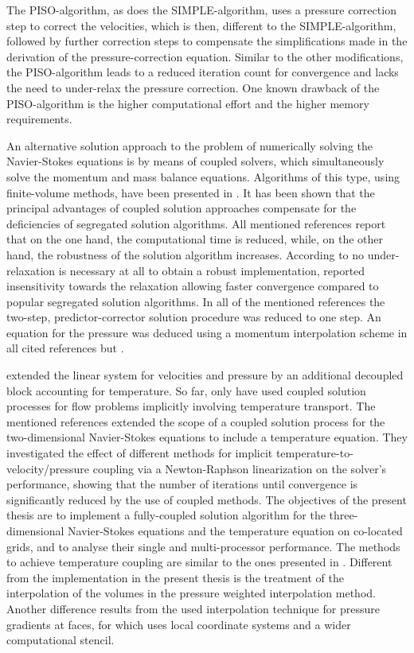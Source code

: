 The PISO-algorithm, as does the SIMPLE-algorithm, uses a pressure correction step to correct the velocities, which is then, different to the SIMPLE-algorithm, followed by further correction steps to compensate the simplifications made in the derivation of the pressure-correction equation. Similar to the other modifications, the PISO-algorithm leads to a reduced iteration count for convergence and lacks the need to under-relax the pressure correction. One known drawback of the PISO-algorithm is the higher computational effort and the higher memory requirements.

An alternative solution approach to the problem of numerically solving the Navier-Stokes equations is by means of coupled solvers, which simultaneously solve the momentum and mass balance equations. Algorithms of this type, using finite-volume methods, have been presented in \cite{chen10,darwish09,falk13,galpin86,klaij13,mangani14,vakilipour12}. It has been shown \cite{darwish09} that the principal advantages of coupled solution approaches compensate for the deficiencies of segregated solution algorithms. All mentioned references report that on the one hand, the computational time is reduced, while, on the other hand, the robustness of the solution algorithm increases. According to \cite{darwish09} no under-relaxation is necessary at all to obtain a robust implementation, \cite{galpin86} reported insensitivity towards the relaxation allowing faster convergence compared to popular segregated solution algorithms. In all of the mentioned references the two-step, predictor-corrector solution procedure was reduced to one step. An equation for the pressure was deduced using a momentum interpolation scheme \cite{rhie82} in all cited references but \cite{galpin86}.

\cite{chen10} extended the linear system for velocities and pressure by an additional decoupled block accounting for temperature. So far, only \cite{galpin86,vakilipour12} have used coupled solution processes for flow problems implicitly involving temperature transport.  The mentioned references extended the scope of a coupled solution process for the two-dimensional Navier-Stokes equations to include a temperature equation. They investigated the effect of different methods for implicit temperature-to-velocity/pressure coupling via a Newton-Raphson linearization on the solver's performance, showing that the number of iterations until convergence is significantly reduced by the use of coupled methods. The objectives of the present thesis are to implement a fully-coupled solution algorithm for the three-dimensional Navier-Stokes equations and the temperature equation on co-located grids, and to analyse their single and multi-processor performance. The methods to achieve temperature coupling are similar to the ones presented in \cite{vakilipour12}. Different from the implementation in the present thesis is the treatment of the interpolation of the volumes in the pressure weighted interpolation method. Another difference results from the used interpolation technique for pressure gradients at faces, for which \cite{vakilipour12} uses local coordinate systems and a wider computational stencil.

